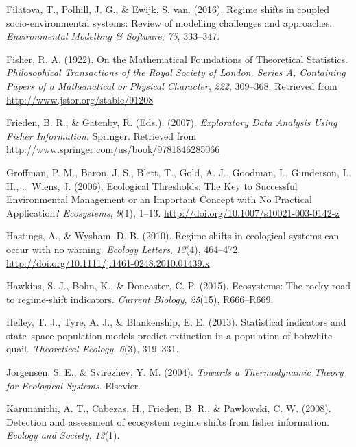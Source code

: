 \documentclass[12pt,twoside,openany]{reedthesis}
\begin{document}
\leavevmode\hypertarget{ref-filatova2016regime}{}%
Filatova, T., Polhill, J. G., \& Ewijk, S. van. (2016). Regime shifts in coupled socio-environmental systems: Review of modelling challenges and approaches. \emph{Environmental Modelling \& Software}, \emph{75}, 333--347.

\leavevmode\hypertarget{ref-fisher_mathematical_1922}{}%
Fisher, R. A. (1922). On the Mathematical Foundations of Theoretical Statistics. \emph{Philosophical Transactions of the Royal Society of London. Series A, Containing Papers of a Mathematical or Physical Character}, \emph{222}, 309--368. Retrieved from \url{http://www.jstor.org/stable/91208}

\leavevmode\hypertarget{ref-frieden_exploratory_2007}{}%
Frieden, B. R., \& Gatenby, R. (Eds.). (2007). \emph{Exploratory Data Analysis Using Fisher Information}. Springer. Retrieved from \url{http://www.springer.com/us/book/9781846285066}

\leavevmode\hypertarget{ref-groffman_ecological_2006}{}%
Groffman, P. M., Baron, J. S., Blett, T., Gold, A. J., Goodman, I., Gunderson, L. H., \ldots{} Wiens, J. (2006). Ecological Thresholds: The Key to Successful Environmental Management or an Important Concept with No Practical Application? \emph{Ecosystems}, \emph{9}(1), 1--13. \url{http://doi.org/10.1007/s10021-003-0142-z}

\leavevmode\hypertarget{ref-hastings_regime_2010}{}%
Hastings, A., \& Wysham, D. B. (2010). Regime shifts in ecological systems can occur with no warning. \emph{Ecology Letters}, \emph{13}(4), 464--472. \url{http://doi.org/10.1111/j.1461-0248.2010.01439.x}

\leavevmode\hypertarget{ref-hawkins2015ecosystems}{}%
Hawkins, S. J., Bohn, K., \& Doncaster, C. P. (2015). Ecosystems: The rocky road to regime-shift indicators. \emph{Current Biology}, \emph{25}(15), R666--R669.

\leavevmode\hypertarget{ref-hefley2013statistical}{}%
Hefley, T. J., Tyre, A. J., \& Blankenship, E. E. (2013). Statistical indicators and state--space population models predict extinction in a population of bobwhite quail. \emph{Theoretical Ecology}, \emph{6}(3), 319--331.

\leavevmode\hypertarget{ref-jorgensen_towards_2004}{}%
Jorgensen, S. E., \& Svirezhev, Y. M. (2004). \emph{Towards a Thermodynamic Theory for Ecological Systems}. Elsevier.

\leavevmode\hypertarget{ref-karunanithi_detection_2008}{}%
Karunanithi, A. T., Cabezas, H., Frieden, B. R., \& Pawlowski, C. W. (2008). Detection and assessment of ecosystem regime shifts from fisher information. \emph{Ecology and Society}, \emph{13}(1).
\end{document}
